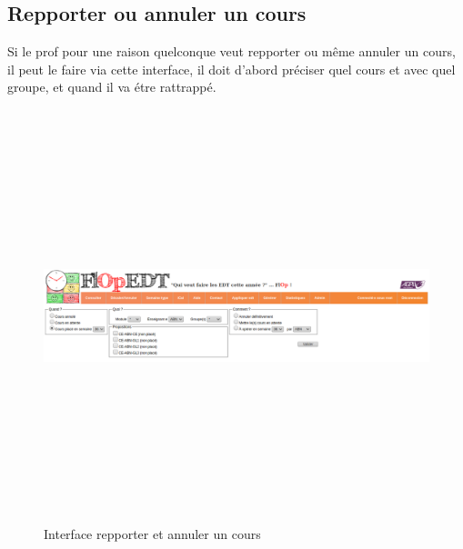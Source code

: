 \subsection*{Repporter ou annuler un cours}
Si le prof pour une raison quelconque veut repporter ou même annuler un cours, il peut le faire via cette interface, il doit d'abord préciser quel cours et avec quel groupe, et quand il va étre rattrappé.
\begin{figure}[H]
      \centering
        \includegraphics[width=15cm,height=12cm]{img/7.png}
        \caption{Interface repporter et annuler un cours}
\end{figure}
\newpage










